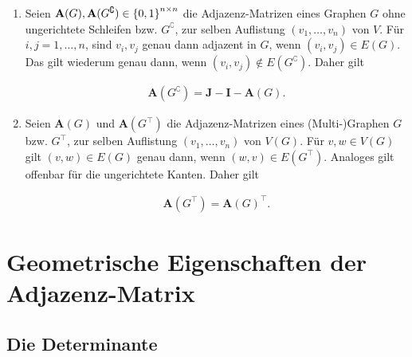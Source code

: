 \begin{remark}
\begin{enumerate}[
                label = \texttt{ad} \arabic*.,
                wide,
                labelindent = 0pt
            ]
                \begin{align*}
                    \mathbf A(\bar G) = \mathbf A(G) + \mathbf A(G)^\top.
                \end{align*}

                Es sei abermals daran erinnert, dass das Summieren der Diagonalen zweckgemäß ist, da ungerichtete Schleifen doppelt zur Adjazenz beitragen.

                \item Seien $\mathbf A(G), \mathbf A(G^\complement) \in {\left \{ 0, 1 \right \}}^{n \times n}$ die Adjazenz-Matrizen eines Graphen $G$ ohne ungerichtete Schleifen bzw. $G^\complement$, zur selben Auflistung $(v_1, \dots, v_n)$ von $V$.
                Für $i, j = 1, \dots, n$, sind $v_i, v_j$ genau dann adjazent in $G$, wenn $(v_i, v_j) \in E(G)$.
                Das gilt wiederum genau dann, wenn $(v_i, v_j) \not \in E(G^\complement)$.
                Daher gilt

                \begin{align*}
                    \mathbf A(G^\complement) = \mathbf J - \mathbf I - \mathbf A(G).
                \end{align*}

                \item Seien $\mathbf A(G)$ und $\mathbf A(G^\top)$ die Adjazenz-Matrizen eines (Multi-)Graphen $G$ bzw. $G^\top$, zur selben Auflistung $(v_1, \dots, v_n)$ von $V(G)$.
                Für $v, w \in V(G)$ gilt $(v, w) \in E(G)$ genau dann, wenn $(w, v) \in E(G^\top)$.
                Analoges gilt offenbar für die ungerichtete Kanten.
                Daher gilt

                \begin{align*}
                    \mathbf A(G^\top) = \mathbf A(G)^\top.
                \end{align*}

            \end{enumerate}

        \end{remark}

        \section{Geometrische Eigenschaften der Adjazenz-Matrix}

        \subsection{Die Determinante}

